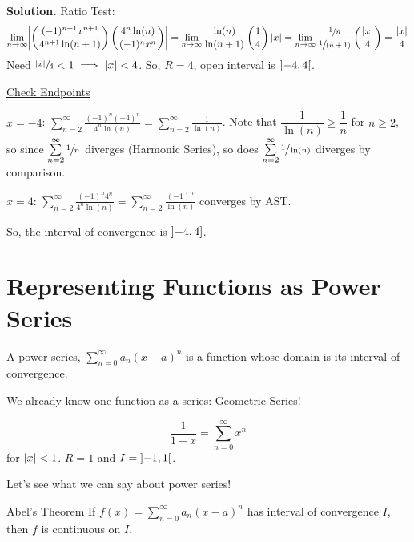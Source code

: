 \begin{Example}{}{}
\begin{enumerate}
              \textbf{Solution.} Ratio Test:
              \[ \lim\limits_{{n} \to {\infty}}
                  \abs*{\left( \frac{(-1)^{n+1}x^{n+1}}{4^{n+1}\ln(n+1)} \right)
                  \left( \frac{4^n\ln(n)}{(-1)^n x^n}  \right)}
                  =\lim\limits_{{n} \to {\infty}} \frac{\ln(n)}{\ln(n+1)} \left( \frac{1}{4} \right)
                  \abs{x}
                  =\lim\limits_{{n} \to {\infty}} \frac{\sfrac{1}{n}}{\sfrac{1}{(n+1)}}
                  \left( \frac{\abs{x}}{4} \right)
                  =\frac{\abs{x}}{4} \]
              Need $ \sfrac{\lvert x\rvert}{4}<1\implies \lvert x\rvert<4  $. So, $ R=4 $,
              open interval is $ \interval[open]{-4}{4} $.

              \underline{Check Endpoints}

              $ x=-4 $: $ \displaystyle \sum\limits_{n=2}^{\infty} \frac{(-1)^n(-4)^n}{4^n\ln(n)}
                  =\sum\limits_{n=2}^{\infty} \frac{1}{\ln(n)} $. Note that $ \dfrac{1}{\ln(n)}
                  \geqslant \dfrac{1}{n} $ for $ n\geqslant 2 $, so
              since $ \sum\limits_{n=2}^{\infty} \sfrac{1}{n} $ diverges (Harmonic Series), so does
              $ \sum\limits_{n=2}^{\infty} \sfrac{1}{\ln(n)} $ diverges by comparison.

              $ x=4 $: $ \displaystyle
                  \sum\limits_{n=2}^{\infty} \frac{(-1)^n4^n}{4^n\ln(n)}=\sum\limits_{n=2}^{\infty}
                  \frac{(-1)^n}{\ln(n)}  $ converges by AST\@.

              So, the interval of convergence is $ \interval[open left]{-4}{4} $.
    \end{enumerate}
\end{Example}

\section{Representing Functions as Power Series}
A power series, $ \sum\limits_{n=0}^{\infty} a_n(x-a)^n $ is a function whose domain is its
interval of convergence.

We already know one function as a series: Geometric Series!

\[ \boxed{\frac{1}{1-x}=\sum\limits_{n=0}^{\infty} x^n} \]
for $ \lvert x\rvert<1 $. $ R=1 $ and $ I=\interval[open]{-1}{1} $.

Let's see what we can say about power series!

\begin{Theorem}{Abel's Theorem}{}
    If $ f(x)=\sum\limits_{n=0}^{\infty} a_n(x-a)^n $ has interval of convergence
    $ I $, then $ f $ is continuous on $ I $.
\end{Theorem}

